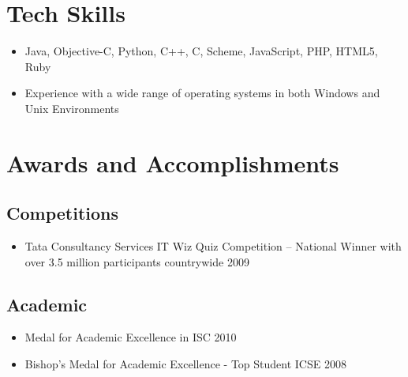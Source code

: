 \documentclass[11pt,a4paper]{moderncv}
\begin{document}
\section{Tech Skills}
\begin{itemize}
\item Java, Objective-C, Python, C++, C, Scheme, JavaScript, PHP, HTML5, Ruby
\item Experience with a wide range of operating systems in both Windows and Unix Environments
\end{itemize}
\section{Awards and Accomplishments}
\subsection{Competitions}
\begin{itemize}
\item Tata Consultancy Services IT Wiz Quiz Competition – National Winner with over 3.5
million participants countrywide \hfill 2009
\end{itemize}
\subsection{Academic}
\begin{itemize}
\item Medal for Academic Excellence in ISC \hfill 2010
\item Bishop’s Medal for Academic Excellence - Top Student ICSE \hfill 2008
\end{itemize}
\end{document}
